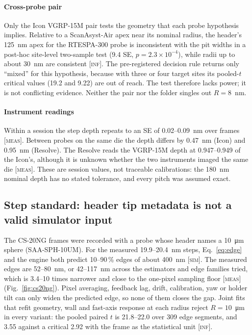 \documentclass[preprint,12pt]{elsarticle}
\newcommand{\tagm}{\textsc{[meas]}}
\newcommand{\tags}{\textsc{[sim]}}
\newcommand{\tagi}{\textsc{[inf]}}
\begin{document}
\paragraph{Cross-probe pair} Only the Icon VGRP-15M pair tests the geometry that each probe
hypothesis implies. Relative to a ScanAsyst-Air apex near its nominal radius, the header's
125~nm apex for the RTESPA-300 probe is inconsistent with the pit widths in a post-hoc
site-level two-sample test (9.4 SE, $p=2.3\times10^{-4}$), while radii up to about 30~nm are
consistent \tagi. The pre-registered decision rule returns only ``mixed'' for this hypothesis,
because with three or four target sites its pooled-$t$ critical values (19.2 and 9.22) are out of
reach. The test therefore lacks power; it is not conflicting evidence. Neither the pair nor the
folder singles out $R=8$~nm.

\paragraph{Instrument readings} Within a session the step depth repeats to an SE of
0.02--0.09~nm over frames \tagm. Between probes on the same die the depth differs by 0.47~nm (Icon) and 0.95~nm (Resolve).
The Resolve reads the VGRP-15M depth at 0.947--0.949 of the Icon's, although it is unknown
whether the two instruments imaged the same die \tagm. These are session values, not traceable
calibrations: the 180~nm nominal depth has no stated tolerance, and every pitch was assumed exact.

\subsection{Step standard: header tip metadata is not a valid simulator input}
\label{sec:cs20ng}

The CS-20NG frames were recorded with a probe whose header names a 10~\si{\micro\metre} sphere
(SAA-SPH-10UM). For the measured 19.9--20.4~nm steps, Eq.~\eqref{eq:edge} and the engine both
predict 10--90\,\% edges of about 400~nm \tags. The measured edges are 52--80~nm, or 42--117~nm
across the estimators and edge families tried, which is 3.4--10 times narrower and close to the
one-pixel sampling floor \tagm (Fig.~\ref{fig:cs20ng}). Pixel averaging, feedback lag, drift,
calibration, yaw or holder tilt can only widen the predicted edge, so none of them closes the
gap. Joint fits that refit geometry, wall and fast-axis response at each radius reject
$R=10$~\si{\micro\metre} in every variant: the pooled paired $t$ is 21.8--22.0 over 309 edge
segments, and 3.55 against a critical 2.92 with the frame as the statistical unit \tagi.
\end{document}

